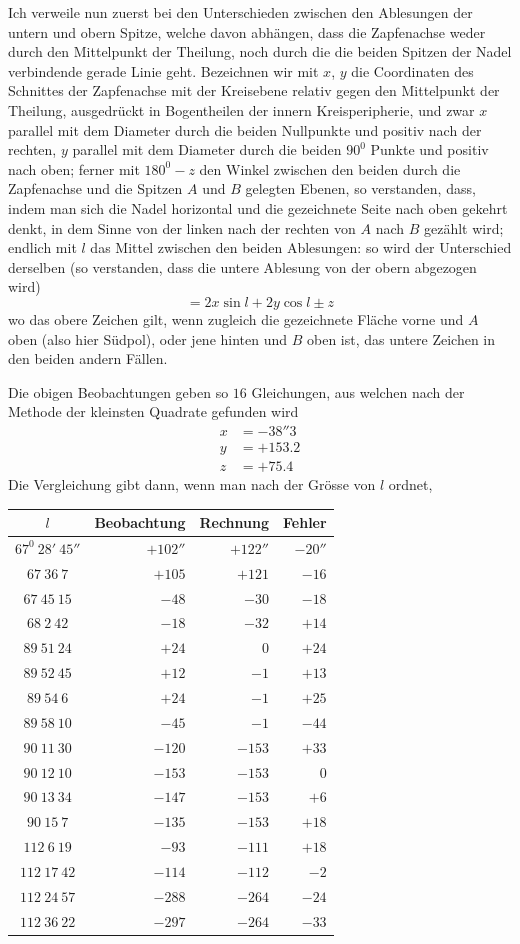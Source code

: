 Ich verweile nun zuerst bei den Unterschieden zwischen den Ablesungen der untern und obern Spitze, welche davon abhängen, dass die Zapfenachse weder durch den Mittelpunkt der Theilung, noch durch die die beiden Spitzen der Nadel verbindende gerade Linie geht. Bezeichnen wir mit $x$, $y$ die Coordinaten des Schnittes der Zapfenachse mit der Kreisebene relativ gegen den Mittelpunkt der Theilung, ausgedrückt in Bogentheilen der innern Kreisperipherie, und zwar $x$ parallel mit dem Diameter durch die beiden Nullpunkte und positiv nach der rechten, $y$ parallel mit dem Diameter durch die beiden $90^0$ Punkte und positiv nach oben; ferner mit $180^0-z$ den Winkel zwischen den beiden durch die Zapfenachse und die Spitzen $A$ und $B$ gelegten Ebenen, so verstanden, dass, indem man sich die Nadel horizontal und die gezeichnete Seite nach oben gekehrt denkt, in dem Sinne von der linken nach der rechten von $A$ nach $B$ gezählt wird; endlich mit $l$ das Mittel zwischen den beiden Ablesungen: so wird der Unterschied derselben (so verstanden, dass die untere Ablesung von der obern abgezogen wird)
\[
=2x\sin l+2y\cos l\pm z
\]
wo das obere Zeichen gilt, wenn zugleich die gezeichnete Fläche vorne und $A$ oben (also hier Südpol), oder jene hinten und $B$ oben ist, das untere Zeichen in den beiden andern Fällen.

Die obigen Beobachtungen geben so $16$ Gleichungen, aus welchen nach der Methode der kleinsten Quadrate gefunden wird
\[
\begin{aligned}
x&=-38''3\\
y&=+153.2\\
z&=+75.4
\end{aligned}
\]
Die Vergleichung gibt dann, wenn man nach der Grösse von $l$ ordnet,
\begin{center}
{\fontsize{9}{11}\selectfont
\begin{tabular}{c|r|r|r}
$l$&Beobachtung&Rechnung&Fehler\\\hline
$67^0\ 28'\ 45''$&$+102''$&$+122''$&$-20''$\\
$67\ 36\ 7$&$+105$&$+121$&$-16$\\
$67\ 45\ 15$&$-48$&$-30$&$-18$\\
$68\ 2\ 42$&$-18$&$-32$&$+14$\\
$89\ 51\ 24$&$+24$&$0$&$+24$\\
$89\ 52\ 45$&$+12$&$-1$&$+13$\\
$89\ 54\ 6$&$+24$&$-1$&$+25$\\
$89\ 58\ 10$&$-45$&$-1$&$-44$\\
$90\ 11\ 30$&$-120$&$-153$&$+33$\\
$90\ 12\ 10$&$-153$&$-153$&$0$\\
$90\ 13\ 34$&$-147$&$-153$&$+6$\\
$90\ 15\ 7$&$-135$&$-153$&$+18$\\
$112\ 6\ 19$&$-93$&$-111$&$+18$\\
$112\ 17\ 42$&$-114$&$-112$&$-2$\\
$112\ 24\ 57$&$-288$&$-264$&$-24$\\
$112\ 36\ 22$&$-297$&$-264$&$-33$
\end{tabular}}
\end{center}

